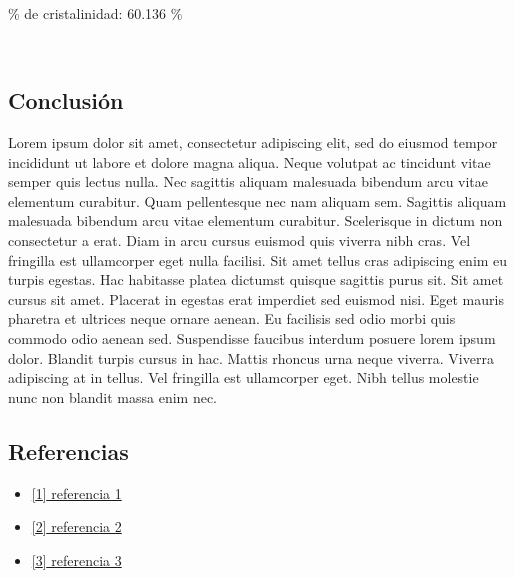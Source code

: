 \documentclass[11pt]{article}
\providecommand{\tightlist}{%
      \setlength{\itemsep}{0pt}\setlength{\parskip}{0pt}}
\begin{document}
    ~

\% de cristalinidad: 60.136 \%

~

    
    \subsection{Conclusión}\label{conclusiuxf3n}

Lorem ipsum dolor sit amet, consectetur adipiscing elit, sed do eiusmod
tempor incididunt ut labore et dolore magna aliqua. Neque volutpat ac
tincidunt vitae semper quis lectus nulla. Nec sagittis aliquam malesuada
bibendum arcu vitae elementum curabitur. Quam pellentesque nec nam
aliquam sem. Sagittis aliquam malesuada bibendum arcu vitae elementum
curabitur. Scelerisque in dictum non consectetur a erat. Diam in arcu
cursus euismod quis viverra nibh cras. Vel fringilla est ullamcorper
eget nulla facilisi. Sit amet tellus cras adipiscing enim eu turpis
egestas. Hac habitasse platea dictumst quisque sagittis purus sit. Sit
amet cursus sit amet. Placerat in egestas erat imperdiet sed euismod
nisi. Eget mauris pharetra et ultrices neque ornare aenean. Eu facilisis
sed odio morbi quis commodo odio aenean sed. Suspendisse faucibus
interdum posuere lorem ipsum dolor. Blandit turpis cursus in hac. Mattis
rhoncus urna neque viverra. Viverra adipiscing at in tellus. Vel
fringilla est ullamcorper eget. Nibh tellus molestie nunc non blandit
massa enim nec.

\subsection{Referencias}\label{referencias}

\begin{itemize}
\tightlist
\item
  \href{'https://www.youtube.com/watch?v=dQw4w9WgXcQ'}{{[}1{]}
  referencia 1}
\item
  \href{'https://www.youtube.com/watch?v=dQw4w9WgXcQ'}{{[}2{]}
  referencia 2}
\item
  \href{'https://www.youtube.com/watch?v=dQw4w9WgXcQ'}{{[}3{]}
  referencia 3}
\end{itemize}


    
    
    
\end{document}
